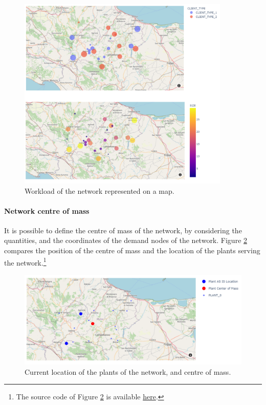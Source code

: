 \begin{figure}[hbt!]
\centering
\includegraphics[width=0.9\textwidth]{SectionDistribution/control_figures/fig_graph_workload.png}
\captionsetup{type=figure}
\caption{Workload of the network represented on a map.}
\label{fig_graph_workload}
\end{figure}

\paragraph{Network centre of mass}

It is possible to define the centre of mass of the network, by considering the quantities, and the coordinates of the demand nodes of the network. Figure \ref{fig_graph_center_of_mass} compares the position of the centre of mass and the location of the plants serving the network.\footnote{The source code of Figure \ref{fig_graph_center_of_mass} is available \href{https://github.com/aletuf93/logproj/blob/master/examples/DIST_02\%20Location\%20assessment.ipynb}{here}.}

\begin{figure}[hbt!]
\centering
\includegraphics[width=1.0\textwidth]{SectionDistribution/control_figures/fig_graph_center_of_mass.png}
\captionsetup{type=figure}
\caption{Current location of the plants of the network, and centre of mass.}
\label{fig_graph_center_of_mass}
\end{figure}

